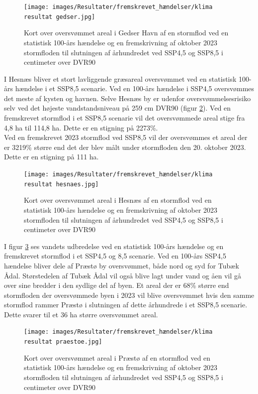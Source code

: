 \begin{figure}[H]
    \centering
    \texttt{[image: images/Resultater/fremskrevet\_hændelser/klima resultat gedser.jpg]}
    \caption{Kort over oversvømmet areal i Gedser Havn af en stormflod ved en statistisk 100-års hændelse og en fremskrivning af oktober 2023 stormfloden til slutningen af århundredet ved SSP4,5 og SSP8,5 i centimeter over DVR90}
    \label{Figur: Klima Gedser Havn}
\end{figure}

I Hesnæs bliver et stort lavliggende græsareal oversvømmet ved en statistisk 100-års hændelse i et SSP8,5 scenarie. Ved en 100-års hændelse i SSP4,5 oversvømmes det meste af kysten og havnen. Selve Hesnæs by er udenfor oversvømmelsesrisiko selv ved det højeste vandstandsniveau på 259 cm DVR90 (figur \ref{Figur: Klima Hesnæs}). Ved en fremskrevet stormflod i et SSP8,5 scenarie vil det oversvømmede areal stige fra 4,8 ha til 114,8 ha. Dette er en stigning på 2273\%. \\
Ved en fremskrevet 2023 stormflod ved SSP8,5 vil der oversvømmes et areal der er 3219\% større end det der blev målt under stormfloden den 20. oktober 2023. Dette er en stigning på 111 ha. 

\begin{figure}[H]
    \centering
    \texttt{[image: images/Resultater/fremskrevet\_hændelser/klima resultat hesnaes.jpg]}
    \caption{Kort over oversvømmet areal i Hesnæs af en stormflod ved en statistisk 100-års hændelse og en fremskrivning af oktober 2023 stormfloden til slutningen af århundredet ved SSP4,5 og SSP8,5 i centimeter over DVR90}
    \label{Figur: Klima Hesnæs}
\end{figure}

I figur \ref{Figur: Klima Præstø} ses vandets udbredelse ved en statistisk 100-års hændelse og en fremskrevet stormflod i et SSP4,5 og 8,5 scenarie. Ved en 100-års SSP4,5 hændelse bliver dele af Præstø by oversvømmet, både nord og syd for Tubæk Ådal. Størstedelen af Tubæk Ådal vil også blive lagt under vand og åen vil gå over sine bredder i den sydlige del af byen. Et areal der er 68\% større end stormfloden der oversvømmede byen i 2023 vil blive oversvømmet hvis den samme stormflod rammer Præstø i slutningen af dette århundrede i et SSP8,5 scenarie. Dette svarer til et 36 ha større oversvømmet areal. 

\begin{figure}[H]
    \centering
    \texttt{[image: images/Resultater/fremskrevet\_hændelser/klima resultat praestoe.jpg]}
    \caption{Kort over oversvømmet areal i Præstø af en stormflod ved en statistisk 100-års hændelse og en fremskrivning af oktober 2023 stormfloden til slutningen af århundredet ved SSP4,5 og SSP8,5 i centimeter over DVR90}
    \label{Figur: Klima Præstø}
\end{figure}

